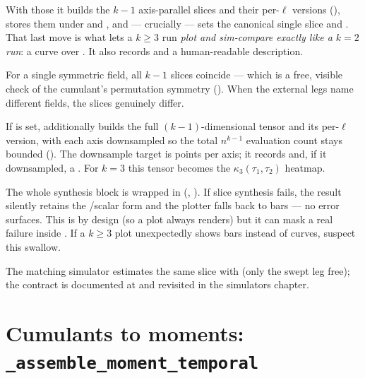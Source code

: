 With those it builds the $k-1$ axis-parallel slices and their per-$\ell$ versions
(), stores them under 
and , and --- crucially --- sets the canonical
single slice  and . That last move is what lets a $k\ge 3$ run \emph{plot and
sim-compare exactly like a $k=2$ run}: a curve over . It also
records  and a human-readable 
description.

\begin{note}
For a single symmetric field, all $k-1$ slices coincide --- which is a free,
visible check of the cumulant's permutation symmetry
(). When the external legs name different
fields, the slices genuinely differ.
\end{note}

If  is set,  additionally builds the full
$(k-1)$-dimensional tensor  and its per-$\ell$ version, with
each axis downsampled so the total $n^{k-1}$ evaluation count stays bounded
(). The downsample target is
 points per axis; it records
 and, if it downsampled, a . For $k=3$
this tensor becomes the $\kappa_3(\tau_1,\tau_2)$ heatmap.

\begin{gotcha}
The whole synthesis block is wrapped in 
(, ). If slice synthesis fails, the
result silently retains the /scalar form and the plotter falls
back to bars --- no error surfaces. This is by design (so a plot always renders)
but it can mask a real failure inside . If a $k\ge 3$ plot
unexpectedly shows bars instead of curves, suspect this swallow.
\end{gotcha}

The matching simulator estimates the same slice with
 (only the swept leg free); the contract is
documented at  and revisited in the
simulators chapter.

\section{Cumulants to moments: \texttt{\_assemble\_moment\_temporal}}\label{sec:moments}

